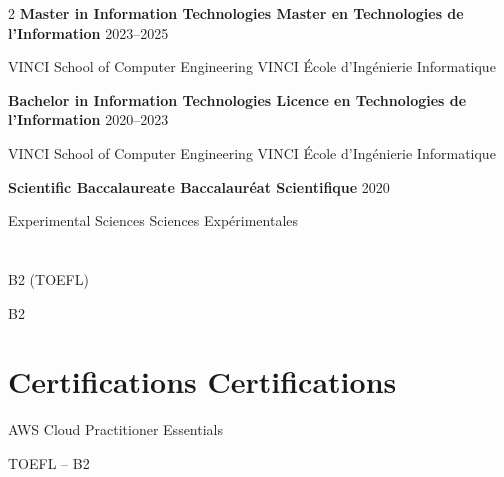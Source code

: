 \documentclass[10pt,a4paper]{article}
\begin{document}
\begin{paracol}{2}
\textbf{
{Master in Information Technologies}
{Master en Technologies de l'Information}
}\hfill 2023--2025

{
VINCI School of Computer Engineering
}
{VINCI École d'Ingénierie Informatique
}

\vspace{1em}

\textbf{
{Bachelor in Information Technologies}
{Licence en Technologies de l'Information}
}\hfill 2020--2023

{
VINCI School of Computer Engineering
}
{VINCI École d'Ingénierie Informatique
}

\vspace{1em}

\textbf{
{Scientific Baccalaureate}
{Baccalauréat Scientifique}
}\hfill 2020

{
Experimental Sciences
}
{Sciences Expérimentales}


\section*{}

 \hfill B2 (TOEFL)

 \hfill {}

 \hfill B2


\section*{
{Certifications}
{Certifications}
}

AWS Cloud Practitioner Essentials \textit{}

TOEFL  -- B2

\switchcolumn



\end{paracol}
\end{document}
